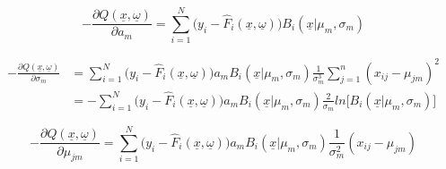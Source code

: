 \documentclass[11pt]{article}
\begin{document}
 \begin{equation}
 - \frac{\partial Q(\underline{x}, \underline{\omega})}{\partial a_m} = \sum_{i =1}^N \Big(y_i - \hat{F}_i(\underline{x}, \underline{\omega}) \Big)B_i(\underline{x}|\mu_m, \sigma_m) 
 \end{equation}
 

\begin{equation}
\begin{split}
 - \frac{\partial Q(\underline{x}, \underline{\omega})}{\partial \sigma_m} & = \sum_{i=1}^N \Big(y_i - \hat{F}_i(\underline{x}, \underline{\omega}) \Big) a_m B_i(\underline{x}|\mu_m, \sigma_m) \frac{1}{\sigma_m^3} \sum_{j = 1}^{n}(x_{ij} - \mu_{jm})^2\\ & = - \sum_{i=1}^N \Big(y_i - \hat{F}_i(\underline{x}, \underline{\omega}) \Big) a_m B_i(\underline{x}|\mu_m, \sigma_m) \frac{2}{\sigma_m} ln \bigg[B_i(\underline{x}|\mu_m, \sigma_m) \bigg]
 \end{split}
 \end{equation}
 
 \begin{equation}
 - \frac{\partial Q(\underline{x}, \underline{\omega})}{\partial \mu_{jm}} = \sum_{i=1}^N\Big(y_i - \hat{F}_i(\underline{x}, \underline{\omega}) \Big) a_m B_i(\underline{x}|\mu_m, \sigma_m) \frac{1}{\sigma_m^2}(x_{ij} - \mu_{jm})
 \end{equation}


\vspace{5 mm}
\noindent
\end{document}
